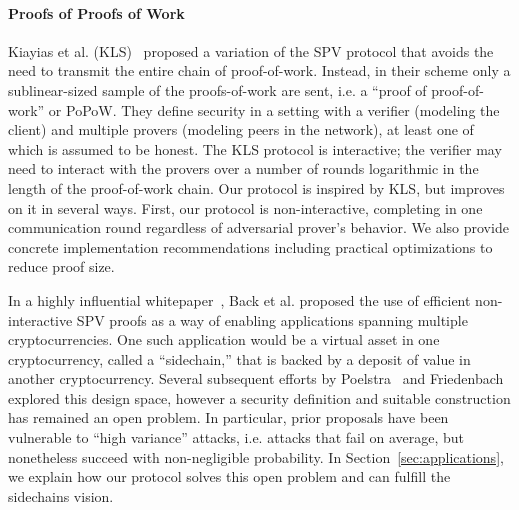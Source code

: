 \paragraph{Proofs of Proofs of Work}
Kiayias et al. (KLS)~\cite{KLS} proposed a variation of the SPV protocol that
avoids the need to transmit the entire chain of proof-of-work. Instead, in
their scheme only a sublinear-sized sample of the proofs-of-work are sent, i.e.
a ``proof of proof-of-work'' or PoPoW. They define security in a setting with a
verifier (modeling the client) and multiple provers (modeling peers in the
network), at least one of which is assumed to be honest. The KLS protocol is
interactive; the verifier may need to interact with the provers over a number
of rounds logarithmic in the length of the proof-of-work chain.
Our protocol is inspired by KLS, but improves on it in several ways. First, our
protocol is non-interactive, completing in one communication round regardless
of adversarial prover's behavior. We also provide concrete implementation
recommendations including practical optimizations to reduce proof size.

In a highly influential whitepaper~\cite{sidechains}, Back et al. proposed the
use of efficient non-interactive SPV proofs as a way of enabling applications
spanning multiple cryptocurrencies. One such application would be a virtual
asset in one cryptocurrency, called a ``sidechain,'' that is backed by a
deposit of value in another cryptocurrency. Several subsequent efforts by
Poelstra~\cite{pos} and Friedenbach~\cite{compactspv} explored this design
space, however a security definition and suitable construction has remained an
open problem. In particular, prior proposals have been vulnerable to ``high
variance'' attacks, i.e. attacks that fail on average, but nonetheless succeed
with non-negligible probability. In Section~\ref{sec:applications}, we explain
how our protocol solves this open problem and can fulfill the sidechains
vision.

